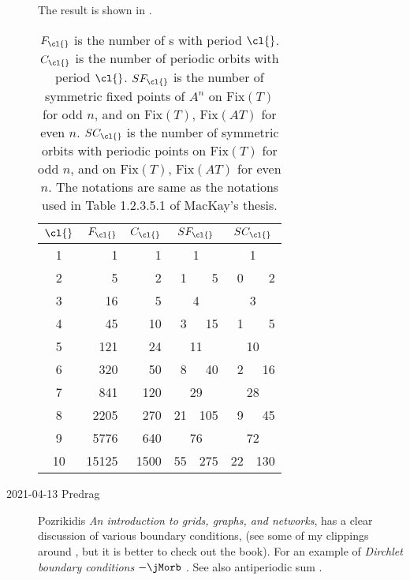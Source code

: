 \begin{description}
The result is shown in .
\begin{table}
\begin{center}
\begin{tabular}{|c|r|r|rr|rr|}
$\cl{}$ &  $F_\cl{}$ &  $C_\cl{}$ &  \multicolumn{2}{c|}{$SF_\cl{}$} &  \multicolumn{2}{c|}{$SC_\cl{}$} \\
\hline
1 & 1 & 1& \multicolumn{2}{c|}{1} & \multicolumn{2}{c|}{1}	\\
2 & 5 & 2 & 1 & 5 & 0 & 2	\\
3 & 16 & 5 & \multicolumn{2}{c|}{4} & \multicolumn{2}{c|}{3}	\\
4 & 45 & 10 & 3 & 15 & 1 & 5	\\
5 & 121 & 24 & \multicolumn{2}{c|}{11} & \multicolumn{2}{c|}{10}	\\
6 & 320 & 50 &	8 & 40 & 2 & 16\\
7 & 841 & 120 & \multicolumn{2}{c|}{29} & \multicolumn{2}{c|}{28}	\\
8 & 2205 & 270 & 21 & 105 & 9 & 45	\\
9 & 5776 & 640 & \multicolumn{2}{c|}{76} & \multicolumn{2}{c|}{72}	\\
10 &	15125 & 1500 & 55 & 275 & 22 & 130\\
\end{tabular}
\bigskip
\caption{\label{tab:Bmack93Fixed}
$F_\cl{}$ is the number of {\lattstate}s with period $\cl{}$.
$C_\cl{}$ is the number of periodic orbits with period $\cl{}$.
$SF_\cl{}$ is the number of symmetric fixed points of $A^n$ on
$\text{Fix}(T)$ for odd $n$, and on $\text{Fix}(T)$, $\text{Fix}(AT)$
for even $n$.
$SC_\cl{}$ is the number of symmetric orbits with periodic points on
$\text{Fix}(T)$ for odd $n$, and on $\text{Fix}(T)$, $\text{Fix}(AT)$
for even $n$.
The notations are same as the notations used in Table 1.2.3.5.1 of
MacKay's thesis.
    }
\end{center}
\end{table}

    \item[2021-04-13 Predrag]
Pozrikidis
{\em An introduction to grids, graphs, and networks},
has a clear discussion of various boundary conditions,
(see some of my clippings around , but it is
better to check out the book).
For an example of  \emph{Dirchlet boundary conditions} {\jacobianOrb}
$-\jMorb$ .
See also antiperiodic sum .


\end{description}
